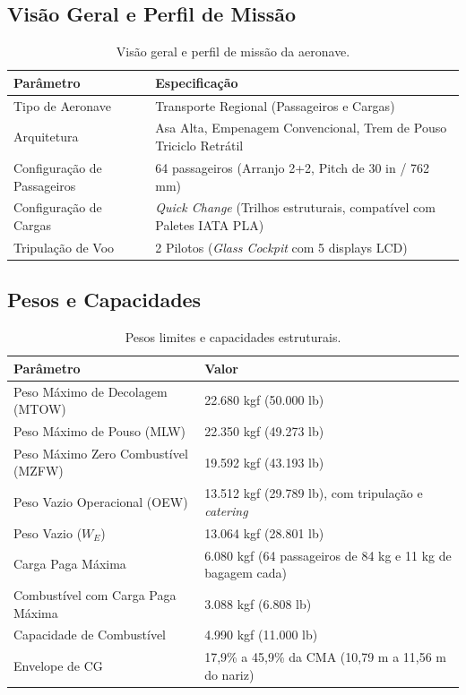 \subsection{Visão Geral e Perfil de Missão}
\begin{table}[htbp]
\centering
\small
\begin{tabularx}{\textwidth}{lX}
\toprule
\textbf{Parâmetro} & \textbf{Especificação} \\
\midrule
Tipo de Aeronave & Transporte Regional (Passageiros e Cargas) \\
Arquitetura & Asa Alta, Empenagem Convencional, Trem de Pouso Triciclo Retrátil \\
Configuração de Passageiros & 64 passageiros (Arranjo 2+2, Pitch de 30 in / 762 mm) \\
Configuração de Cargas & \textit{Quick Change} (Trilhos estruturais, compatível com Paletes IATA PLA) \\
Tripulação de Voo & 2 Pilotos (\textit{Glass Cockpit} com 5 displays LCD) \\
\bottomrule
\end{tabularx}
\caption{Visão geral e perfil de missão da aeronave.}
\label{tab:visao_geral}
\end{table}


\subsection{Pesos e Capacidades}
\begin{table}[htbp]
\centering
\small
\begin{tabularx}{\textwidth}{lX}
\toprule
\textbf{Parâmetro} & \textbf{Valor} \\
\midrule
Peso Máximo de Decolagem (MTOW) & 22.680 kgf (50.000 lb) \\
Peso Máximo de Pouso (MLW) & 22.350 kgf (49.273 lb) \\
Peso Máximo Zero Combustível (MZFW) & 19.592 kgf (43.193 lb) \\
Peso Vazio Operacional (OEW) & 13.512 kgf (29.789 lb), com tripulação e \textit{catering} \\
Peso Vazio ($W_E$) & 13.064 kgf (28.801 lb) \\
Carga Paga Máxima & 6.080 kgf (64 passageiros de 84 kg e 11 kg de bagagem cada) \\
Combustível com Carga Paga Máxima & 3.088 kgf (6.808 lb) \\
Capacidade de Combustível & 4.990 kgf (11.000 lb) \\
Envelope de CG & 17,9\% a 45,9\% da CMA (10,79 m a 11,56 m do nariz) \\
\bottomrule
\end{tabularx}
\caption{Pesos limites e capacidades estruturais.}
\label{tab:pesos_capacidades}
\end{table}

